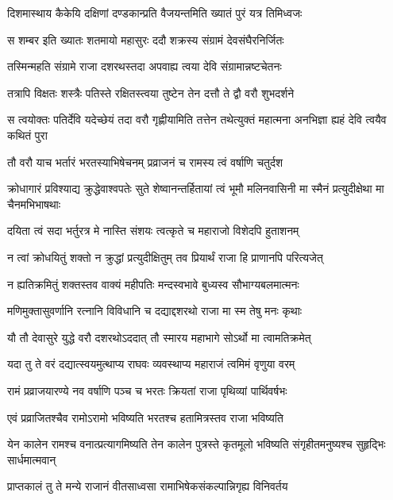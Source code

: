 \twolineshloka
{दिशमास्थाय कैकेयि दक्षिणां दण्डकान्प्रति}
{वैजयन्तमिति ख्यातं पुरं यत्र तिमिध्वजः} %

\twolineshloka
{स शम्बर इति ख्यातः शतमायो महासुरः}
{ददौ शक्रस्य संग्रामं देवसंघैरनिर्जितः} %

\twolineshloka
{तस्मिन्महति संग्रामे राजा दशरथस्तदा}
{अपवाह्य त्वया देवि संग्रामान्नष्टचेतनः} %

\twolineshloka
{तत्रापि विक्षतः शस्त्रैः पतिस्ते रक्षितस्त्वया}
{तुष्टेन तेन दत्तौ ते द्वौ वरौ शुभदर्शने} %

\threelineshloka
{स त्वयोक्तः पतिर्देवि यदेच्छेयं तदा वरौ}
{गृह्णीयामिति तत्तेन तथेत्युक्तं महात्मना}
{अनभिज्ञा ह्यहं देवि त्वयैव कथितं पुरा} %

\twolineshloka
{तौ वरौ याच भर्तारं भरतस्याभिषेचनम्}
{प्रव्राजनं च रामस्य त्वं वर्षाणि चतुर्दश} %

\threelineshloka
{क्रोधागारं प्रविश्याद्य क्रुद्धेवाश्वपतेः सुते}
{शेष्वानन्तर्हितायां त्वं भूमौ मलिनवासिनी}
{मा स्मैनं प्रत्युदीक्षेथा मा चैनमभिभाषथाः} %

\twolineshloka
{दयिता त्वं सदा भर्तुरत्र मे नास्ति संशयः}
{त्वत्कृते च महाराजो विशेदपि हुताशनम्} %

\twolineshloka
{न त्वां क्रोधयितुं शक्तो न क्रुद्धां प्रत्युदीक्षितुम्}
{तव प्रियार्थं राजा हि प्राणानपि परित्यजेत्} %

\twolineshloka
{न ह्यतिक्रमितुं शक्तस्तव वाक्यं महीपतिः}
{मन्दस्वभावे बुध्यस्व सौभाग्यबलमात्मनः} %

\twolineshloka
{मणिमुक्तासुवर्णानि रत्नानि विविधानि च}
{दद्याद्दशरथो राजा मा स्म तेषु मनः कृथाः} %

\twolineshloka
{यौ तौ देवासुरे युद्धे वरौ दशरथोऽददात्}
{तौ स्मारय महाभागे सोऽर्थो मा त्वामतिक्रमेत्} %

\twolineshloka
{यदा तु ते वरं दद्यात्स्वयमुत्थाप्य राघवः}
{व्यवस्थाप्य महाराजं त्वमिमं वृणुया वरम्} %

\twolineshloka
{रामं प्रव्राजयारण्ये नव वर्षाणि पञ्च च}
{भरतः क्रियतां राजा पृथिव्यां पार्थिवर्षभः} %

\twolineshloka
{एवं प्रव्राजितश्चैव रामोऽरामो भविष्यति}
{भरतश्च हतामित्रस्तव राजा भविष्यति} %

\threelineshloka
{येन कालेन रामश्च वनात्प्रत्यागमिष्यति}
{तेन कालेन पुत्रस्ते कृतमूलो भविष्यति}
{संगृहीतमनुष्यश्च सुहृद्भिः सार्धमात्मवान्} %

\twolineshloka
{प्राप्तकालं तु ते मन्ये राजानं वीतसाध्वसा}
{रामाभिषेकसंकल्पान्निगृह्य विनिवर्तय} %

